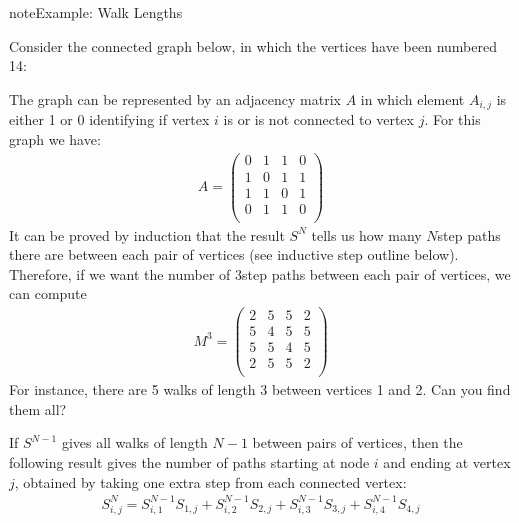 \documentclass[letterpaper,10pt,english]{jupyterBook}
\begin{document}
\begin{sphinxadmonition}{note}{Example: Walk Lengths}

\sphinxAtStartPar
Consider the connected graph below, in which the vertices have been numbered 1\sphinxhyphen{}4:

\sphinxAtStartPar
{}

\sphinxAtStartPar
The graph can be represented by an adjacency matrix \(A\) in which element \(A_{i,j}\) is either 1 or 0 identifying if  vertex \(i\) is or is not connected to vertex \(j\). For this graph we have:
\begin{equation*}
\begin{split}A=\left(\begin{array}{cccc}0 & 1 & 1 & 0 \\1 & 0 & 1 & 1 \\1 & 1 & 0 & 1 \\0 & 1 & 1 & 0 \\\end{array}\right)\end{split}
\end{equation*}
\sphinxAtStartPar
It can be proved by induction that the result \(S^N\) tells us how many \(N\)\sphinxhyphen{}step paths there are between each pair of vertices (see inductive step outline below). Therefore, if we want the number of 3\sphinxhyphen{}step paths between each pair of vertices, we can compute
\begin{equation*}
\begin{split}M^3=\left(\begin{array}{cccc}2 & 5 & 5 & 2 \\5 & 4 & 5 & 5 \\5 & 5 & 4 & 5 \\2 & 5 & 5 & 2 \\\end{array}\right)\end{split}
\end{equation*}
\sphinxAtStartPar
For instance, there are 5 walks of length 3 between vertices 1 and 2. Can you find them all?

\sphinxAtStartPar
{}

\sphinxAtStartPar
If \(S^{N-1}\) gives all walks of length \(N-1\) between pairs of vertices, then the following result gives the number of paths starting at node \(i\) and ending at vertex \(j\), obtained by taking one extra step from each connected vertex:
\begin{equation*}
\begin{split}S^N_{i,j}=S^{N-1}_{i,1}S_{1,j}+S^{N-1}_{i,2}S_{2,j}+S^{N-1}_{i,3}S_{3,j}+S^{N-1}_{i,4}S_{4,j}\end{split}
\end{equation*}\end{sphinxadmonition}
\end{document}
